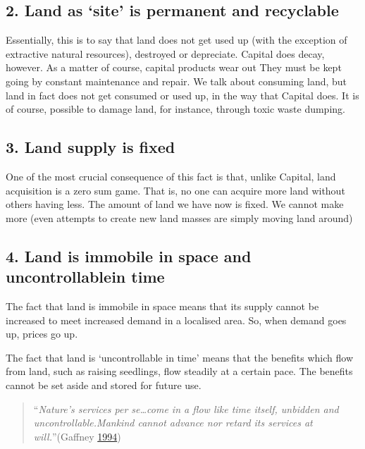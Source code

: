 \documentclass[]{tufte-handout}
\begin{document}
\hypertarget{land-as-site-is-permanent-and-recyclable}{%
\subsection{2. Land as `site' is permanent and
recyclable}\label{land-as-site-is-permanent-and-recyclable}}

Essentially, this is to say that land does not get used up (with the
exception of extractive natural resources), destroyed or depreciate.
Capital does decay, however. As a matter of course, capital products
wear out They must be kept going by constant maintenance and repair. We
talk about consuming land, but land in fact does not get consumed or
used up, in the way that Capital does. It is of course, possible to
damage land, for instance, through toxic waste dumping.

\hypertarget{land-supply-is-fixed}{%
\subsection{3. Land supply is fixed}\label{land-supply-is-fixed}}

One of the most crucial consequence of this fact is that, unlike
Capital, land acquisition is a zero sum game. That is, no one can
acquire more land without others having less. The amount of land we have
now is fixed. We cannot make more (even attempts to create new land
masses are simply moving land around)

\hypertarget{land-is-immobile-in-space-and-uncontrollablein-time}{%
\subsection{4. Land is immobile in space and uncontrollablein
time}\label{land-is-immobile-in-space-and-uncontrollablein-time}}

The fact that land is immobile in space means that its supply cannot be
increased to meet increased demand in a localised area. So, when demand
goes up, prices go up.

The fact that land is `uncontrollable in time' means that the benefits
which flow from land, such as raising seedlings, flow steadily at a
certain pace. The benefits cannot be set aside and stored for future
use.

\begin{quote}
``\emph{Nature's services per se\ldots{}come in a flow like time itself,
unbidden and uncontrollable.Mankind cannot advance nor retard its
services at will.}''(Gaffney \protect\hyperlink{ref-Gaffney1994}{1994})
\end{quote}
\end{document}
